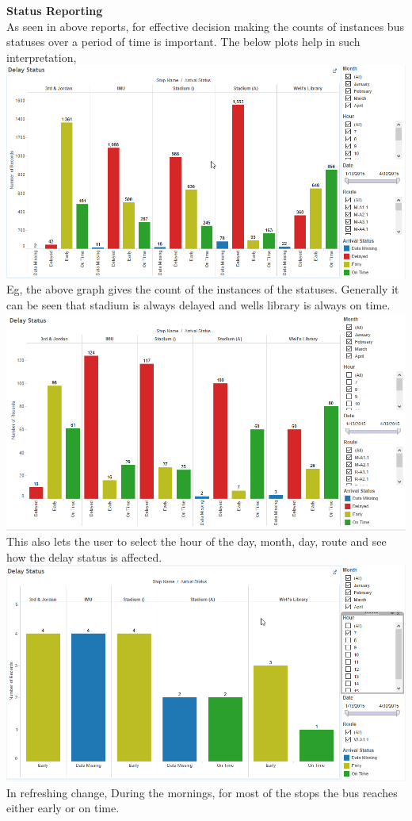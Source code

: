 \documentclass[12pt]{article}\usepackage[]{graphicx}\usepackage[]{color}
\begin{document}
\textbf{Status Reporting} \\
As seen in above reports, for effective decision making the counts of instances bus statuses over a period of time is important. The below plots help in such interpretation,\\
\includegraphics[scale=0.55]{resources/tableau1}\\[1cm] 
Eg, the above graph gives the count of the instances of the statuses. Generally it can be seen that stadium is always delayed and wells library is always on time.\\
\includegraphics[scale=0.55]{resources/tableau2}\\[1cm] 
This also lets the user to select the hour of the day, month, day, route and see how the delay status is affected.\\
\includegraphics[scale=0.55]{resources/tableau3}\\[1cm] 
In refreshing change, During the mornings, for most of the stops the bus reaches either early or on time.
\end{document}
